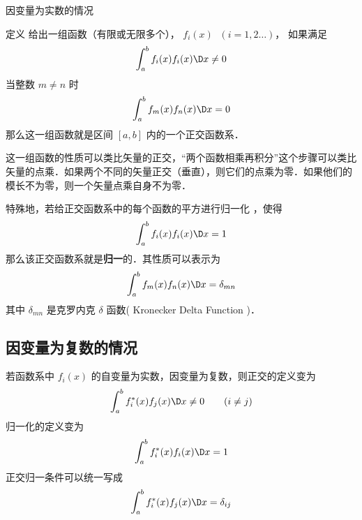 
因变量为实数的情况

定义
给出一组函数（有限或无限多个）， ${f_i}(x)\;$ $( {i = 1,2\dots} )$，  如果满足
\begin{equation}
\int_a^b {{f_i}(x)} {f_i}(x)\D x \ne 0
\end{equation} 
当整数 $m \ne n$ 时
\begin{equation}
\int_a^b {{f_m}(x)} {f_n}(x)\D x = 0
\end{equation} 
那么这一组函数就是区间 $[a,b]$ 内的一个正交函数系．

这一组函数的性质可以类比矢量的正交，“两个函数相乘再积分”这个步骤可以类比矢量的点乘．如果两个不同的矢量正交（垂直），则它们的点乘为零．如果他们的模长不为零，则一个矢量点乘自身不为零．

特殊地，若给正交函数系中的每个函数的平方进行归一化%
，使得
\begin{equation}
\int_a^b {{f_i}(x)} {f_i}(x)\D x = 1
\end{equation} 
那么该正交函数系就是\textbf{归一}的．其性质可以表示为
 \begin{equation}
\int_a^b {{f_m}(x)} {f_n}(x)\D x = {\delta _{mn}}
\end{equation} 
其中 ${\delta _{mn}}$ 是克罗内克 $\delta$ 函数( Kronecker Delta Function )．


\subsection{因变量为复数的情况}

若函数系中 ${f_i}(x)$ 的自变量为实数，因变量为复数，则正交的定义变为
 \begin{equation}
\int_a^b {f_i^*(x)} {f_j}(x)\D x \ne 0 \qquad ( {i \ne j} )
\end{equation}    
归一化的定义变为
 \begin{equation}
\int_a^b {f_i^*(x)} {f_i}(x)\D x = 1
\end{equation} 
正交归一条件可以统一写成
 \begin{equation}
\int_a^b {f_i^*(x)} {f_j}(x)\D x = {\delta _{ij}}
\end{equation}